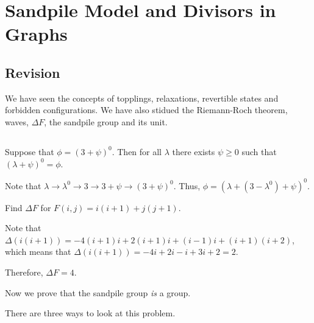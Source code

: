 \documentclass[11pt]{scrartcl}
\begin{document}
  \section{Sandpile Model and Divisors in Graphs}

  \subsection{Revision}

  We have seen the concepts of topplings, relaxations, revertible
  states and forbidden configurations. We have also stidued the
  Riemann-Roch theorem, waves, $\Delta F$, the sandpile group and its
  unit.

  \subsection{}

  \begin{exercise}

    Suppose that $\phi = (3 + \psi)^{0}$. Then for all $\lambda$ there
    exists $\psi \geq 0$ such that $(\lambda + \psi)^{0} = \phi$.

  \end{exercise}

  \begin{soln}
    \hfill

    Note that
    $\lambda \to \lambda^{0} \to 3 \to 3+ \psi \to (3+\psi)^{0}$.
    Thus, $\phi = (\lambda + (3-\lambda^{0})+\psi)^{0}$.
  \end{soln}

  \begin{exercise}

    Find $\Delta F$ for $F(i, j) = i(i+1) + j(j+1)$.

  \end{exercise}

  \begin{soln}
    \hfill

    Note that $\Delta(i(i+1)) = -4(i+1)i+2(i+1)i +(i-1)i +(i+1)(i+2)$,
    which means that $\Delta(i(i+1)) = -4i +2i -i +3i + 2 = 2$.

    Therefore, $\Delta F = 4$.
    
  \end{soln}

  Now we prove that the sandpile group \textit{is} a group.

  There are three ways to look at this problem.
\end{document}
